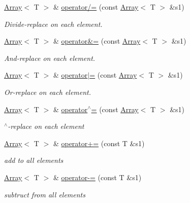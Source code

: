 \begin{DoxyCompactItemize}
\mbox{\hyperlink{classXMLArray_1_1Array}{Array}}$<$ T $>$ \& \mbox{\hyperlink{classXMLArray_1_1Array_ad729e7678e412fb09104173dbe12a1fc}{operator/=}} (const \mbox{\hyperlink{classXMLArray_1_1Array}{Array}}$<$ T $>$ \&s1)
\begin{DoxyCompactList}\small\item\em Divide-\/replace on each element. \end{DoxyCompactList}\item 
\mbox{\hyperlink{classXMLArray_1_1Array}{Array}}$<$ T $>$ \& \mbox{\hyperlink{classXMLArray_1_1Array_a7a015abc3dfa498a8feb234b51d4c341}{operator\&=}} (const \mbox{\hyperlink{classXMLArray_1_1Array}{Array}}$<$ T $>$ \&s1)
\begin{DoxyCompactList}\small\item\em And-\/replace on each element. \end{DoxyCompactList}\item 
\mbox{\hyperlink{classXMLArray_1_1Array}{Array}}$<$ T $>$ \& \mbox{\hyperlink{classXMLArray_1_1Array_a4a61c5f3146f39c99758bad927e08de7}{operator$\vert$=}} (const \mbox{\hyperlink{classXMLArray_1_1Array}{Array}}$<$ T $>$ \&s1)
\begin{DoxyCompactList}\small\item\em Or-\/replace on each element. \end{DoxyCompactList}\item 
\mbox{\hyperlink{classXMLArray_1_1Array}{Array}}$<$ T $>$ \& \mbox{\hyperlink{classXMLArray_1_1Array_a8e2621caf3277b85e6898a3eceb9b233}{operator$^\wedge$=}} (const \mbox{\hyperlink{classXMLArray_1_1Array}{Array}}$<$ T $>$ \&s1)
\begin{DoxyCompactList}\small\item\em $^\wedge$-\/replace on each element \end{DoxyCompactList}\item 
\mbox{\hyperlink{classXMLArray_1_1Array}{Array}}$<$ T $>$ \& \mbox{\hyperlink{classXMLArray_1_1Array_ad3487cb84f2a45cc24ed06f5e96a62ee}{operator+=}} (const T \&s1)
\begin{DoxyCompactList}\small\item\em add to all elements \end{DoxyCompactList}\item 
\mbox{\hyperlink{classXMLArray_1_1Array}{Array}}$<$ T $>$ \& \mbox{\hyperlink{classXMLArray_1_1Array_af903951b5031ab6aa7ee8e2682055f91}{operator-\/=}} (const T \&s1)
\begin{DoxyCompactList}\small\item\em subtruct from all elements \end{DoxyCompactList}\item 

\end{DoxyCompactItemize}
